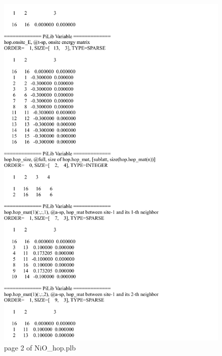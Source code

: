 \documentclass[10pt,a4paper]{article}
\begin{document}
\begin{figure}[tbp]
\centering
\includegraphics[width=0.9\columnwidth]{NiO_hop_p2.pdf}
\caption{page 2 of NiO\_hop.plb}
\end{figure}
\end{document}
